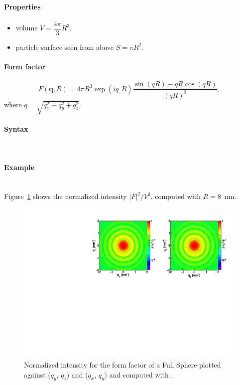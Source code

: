 \paragraph{Properties}
\begin{itemize}
\item volume $V = \dfrac{4\pi}{3}R^3$,
\item particle surface seen from above $S= \pi R^2$.
\end{itemize}

\paragraph{Form factor}
\begin{equation*}
F(\mathbf{q},R) = 4\pi R^3 \exp(iq_z R)\frac{\sin(q R) - q R \cos(q R)}{(qR)^3},
\end{equation*}
where $q=\sqrt{q_x^2 + q_y^2 + q_z^2}$.

\paragraph{Syntax}\strut\\

\newpage

\paragraph{Example}\strut\\
Figure~\ref{fig:FFfSphereEx} shows the normalized intensity $|F|^2/V^2$, computed with $R=8$~nm.
\begin{figure}[ht]
\begin{center}
\includegraphics[angle=-90,width=\textwidth]{fig/ff/figfffsphere.pdf}
\end{center}
\caption{Normalized intensity for the
  form factor of a Full Sphere plotted against ($q_y$, $q_z$) and ($q_x$, $q_y$) and computed with .}
\label{fig:FFfSphereEx}
\end{figure}

